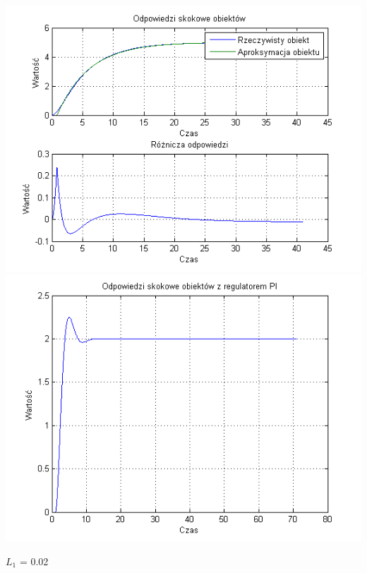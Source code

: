 \documentclass[10pt,a4paper]{article}
\begin{document}
\begin{center}
\includegraphics[scale=1]{images/jeden/skrypt_189.png}\\
\includegraphics[scale=1]{images/jeden/skrypt_190.png}\\
\end{center}
\newpage
$L_1$ = 0.02
\end{document}
